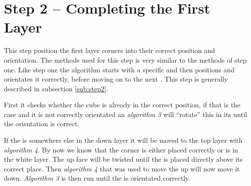 \section{Step 2 -- Completing the First Layer}
This step position the first layer corners into their correct position and orientation. The methods used for this step is very similar to the methods of step one. 
Like step one the algorithm starts with a specific \cpiece{} and then positions and orientates it correctly, before moving on to the next \cpiece. 
This step is generally described in subsection \ref{sub:step2}.

First it checks whether the cube is already in the correct position, if that is the case and it is not correctly orientated an \textit{algorithm 3} will ``rotate'' this \cpiece{} in its \cubicle{} until the orientation is correct. 

If the \cpiece{} is somewhere else in the down layer it will be moved to the top layer with \textit{algorithm 4}. 
By now we know that the corner \cpiece{} is either placed correctly or is in the white layer. 
The up face will be twisted until the \cpiece{} is placed directly above its correct place. 
Then \textit{algorithm 4} that was used to move the \cpiece{} up will now move it down. 
\textit{Algorithm 3} is then run until the \cpiece{} is orientated correctly.